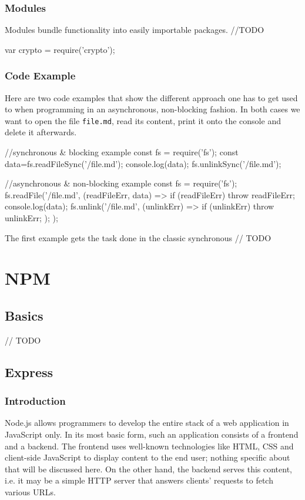 \documentclass{bioinfo}
\begin{document}
\subsubsection{Modules}

Modules bundle functionality into easily importable packages. 
//TODO
\begin{verbatim*}
    var crypto = require('crypto');
\end{verbatim*}
\subsubsection{Code Example}
Here are two code examples that show the different approach one has to get used to when programming in an asynchronous, non-blocking fashion. In both cases we want to open the file \texttt{file.md}, read its content, print it onto the console and delete it afterwards.
\begin{verbatim*}
    //synchronous & blocking example
    const fs = require('fs');
    const data=fs.readFileSync('/file.md');
    console.log(data);
    fs.unlinkSync('/file.md');

    //asynchronous & non-blocking example
    const fs = require('fs');
    fs.readFile('/file.md', (readFileErr, data) => 
    {
        if (readFileErr) throw readFileErr;
        console.log(data);
        fs.unlink('/file.md', (unlinkErr) => 
        {
            if (unlinkErr) throw unlinkErr;
        });
    });
\end{verbatim*}

The first example gets the task done in the classic synchronous 
// TODO

\section{NPM}

\subsection{Basics}
// TODO

\subsection{Express}

\subsubsection{Introduction}

Node.js allows programmers to develop the entire stack of a web application in JavaScript only. In its most basic form, such an application consists of a frontend and a backend. The frontend uses well-known technologies like HTML, CSS and client-side JavaScript to display content to the end user; nothing specific about that will be discussed here. On the other hand, the backend serves this content, i.e. it may be a simple HTTP server that answers clients' requests to fetch various URLs.
\end{document}
